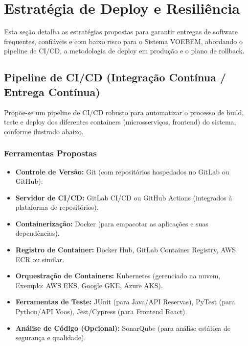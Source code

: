 \chapter{Estratégia de Deploy e Resiliência}
\label{chap:deploy-resiliencia}

Esta seção detalha as estratégias propostas para garantir entregas de software frequentes, confiáveis e com baixo risco para o Sistema VOEBEM, abordando o pipeline de CI/CD, a metodologia de deploy em produção e o plano de rollback.

\section{Pipeline de CI/CD (Integração Contínua / Entrega Contínua)}
\label{sec:cicd}

Propõe-se um pipeline de CI/CD robusto para automatizar o processo de build, teste e deploy dos diferentes containers (microsserviços, frontend) do sistema, conforme ilustrado abaixo.

\subsection{Ferramentas Propostas}
\label{subsec:cicd-ferramentas}
\begin{itemize}
    \item \textbf{Controle de Versão:} Git (com repositórios hospedados no GitLab ou GitHub).
    \item \textbf{Servidor de CI/CD:} GitLab CI/CD ou GitHub Actions (integrados à plataforma de repositórios).
    \item \textbf{Containerização:} Docker (para empacotar as aplicações e suas dependências).
    \item \textbf{Registro de Container:} Docker Hub, GitLab Container Registry, AWS ECR ou similar.
    \item \textbf{Orquestração de Containers:} Kubernetes (gerenciado na nuvem, Exemplo: AWS EKS, Google GKE, Azure AKS).
    \item \textbf{Ferramentas de Teste:} JUnit (para Java/API Reservas), PyTest (para Python/API Voos), Jest/Cypress (para Frontend React).
    \item \textbf{Análise de Código (Opcional):} SonarQube (para análise estática de segurança e qualidade).
\end{itemize}

